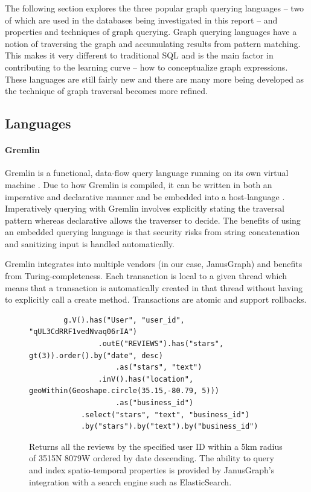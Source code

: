 The following section explores the three popular graph querying languages -- two of which are used in the databases being investigated in this report -- and properties and techniques of graph querying. Graph querying languages have a notion of traversing the graph and accumulating results from pattern matching. This makes it very different to traditional SQL and is the main factor in contributing to the learning curve -- how to conceptualize graph expressions. These languages are still fairly new and there are many more being developed as the technique of graph traversal becomes more refined.

\subsection{Languages}
\label{subsec:lang}

\paragraph{Gremlin}

Gremlin is a functional, data-flow query language running on its own virtual machine \cite{gremlin-tinkerpop}. Due to how Gremlin is compiled, it can be written in both an imperative and declarative manner and be embedded into a host-language \cite{tinkerpop-docs}. Imperatively querying with Gremlin involves explicitly stating the traversal pattern whereas declarative allows the traverser to decide. The benefits of using an embedded querying language is that security risks from string concatenation and sanitizing input is handled automatically.

Gremlin integrates into multiple vendors (in our case, JanusGraph) and benefits from Turing-completeness. Each transaction is local to a given thread which means that a transaction is automatically created in that thread without having to explicitly call a create method. Transactions are atomic and support rollbacks.

\begin{figure}[h]
    \centering
    \begin{verbatim}
        g.V().has("User", "user_id", "qUL3CdRRF1vedNvaq06rIA")
                .outE("REVIEWS").has("stars", gt(3)).order().by("date", desc)
                    .as("stars", "text")
                .inV().has("location", geoWithin(Geoshape.circle(35.15,-80.79, 5)))
                    .as("business_id")
            .select("stars", "text", "business_id")
            .by("stars").by("text").by("business_id")
    \end{verbatim}
    \caption{Returns all the reviews by the specified user ID within a 5km radius of 35\degree 15N 80\degree 79W ordered by date descending. The ability to query and index spatio-temporal properties is provided by JanusGraph's integration with a search engine such as ElasticSearch.}
    \label{lst:gremlin-example-1}
\end{figure}


